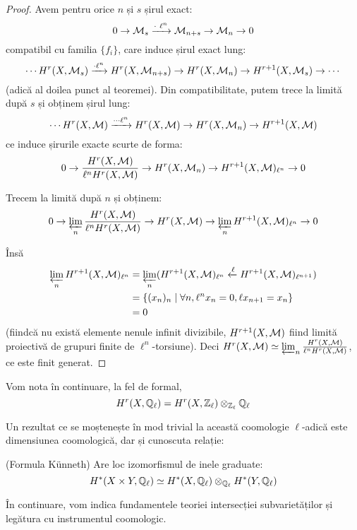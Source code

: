 \documentclass[13pt,openany,oneside]{book}
\begin{document}
\begin{proof}
Avem pentru orice $n$ și $s$ șirul exact:
$$0 \rightarrow \mathcal{M}_s \xrightarrow{\cdot\ \ell^n} \mathcal{M}_{n+s} \rightarrow \mathcal{M}_n \rightarrow 0$$
compatibil cu familia $\{f_i\}$, care induce șirul exact lung:
$$\cdots H^r(X,\mathcal{M}_s) \xrightarrow{\cdot \ell^n} H^r(X,\mathcal{M}_{n+s}) \rightarrow H^r(X,\mathcal{M}_n) \rightarrow H^{r+1}(X,\mathcal{M}_s) \rightarrow \cdots$$
(adică al doilea punct al teoremei).
Din compatibilitate, putem trece la limită după $s$ și obținem șirul lung:
$$\cdots H^r(X,\mathcal{M}) \xrightarrow{\cdots \ell^n} H^r(X,\mathcal{M}) \rightarrow H^r(X,\mathcal{M}_n) \rightarrow H^{r+1}(X,\mathcal{M})$$
ce induce șirurile exacte scurte de forma:
$$0 \rightarrow \frac{H^r(X,\mathcal{M})}{\ell^n H^r(X,\mathcal{M})} \rightarrow H^r(X,\mathcal{M}_n) \rightarrow H^{r+1}(X,\mathcal{M})_{\ell^n} \rightarrow 0$$

Trecem la limită după $n$ și obținem:
$$0 \rightarrow \varprojlim_n \frac{H^r(X,\mathcal{M})}{\ell^n H^r(X,\mathcal{M})} \rightarrow H^r(X,\mathcal{M}) \rightarrow \varprojlim_n H^{r+1}(X,\mathcal{M})_{\ell^n} \rightarrow 0$$

Însă
\begin{align*}
\varprojlim_n H^{r+1}(X,\mathcal{M})_{\ell^n} &= \varprojlim_n (H^{r+1}(X,\mathcal{M})_{\ell^n} \xleftarrow{\ell} H^{r+1}(X,\mathcal{M})_{\ell^{n+1}})\\
&=\{(x_n)_n \mid \forall n, \ell^n x_n=0, \ell x_{n+1}=x_n\}\\
&=0
\end{align*}
(fiindcă nu există elemente nenule infinit divizibile, $H^{r+1}(X,\mathcal{M})$ fiind limită proiectivă de grupuri finite de $\ell^n$-torsiune). Deci $H^r(X,\mathcal{M})\simeq \varprojlim_n \frac{H^r(X,\mathcal{M})}{\ell^n H^r(X,\mathcal{M})}$, ce este finit generat.
\end{proof}

Vom nota în continuare, la fel de formal,
$$H^r(X,\mathbb{Q}_\ell) = H^r(X,\mathbb{Z}_\ell) \otimes_{\mathbb{Z}_\ell} \mathbb{Q}_\ell$$

Un rezultat ce se moștenește în mod trivial la această coomologie $\ell$-adică este dimensiunea coomologică, dar și cunoscuta relație:

\begin{teo}
(Formula Künneth) Are loc izomorfismul de inele graduate:
$$H^*(X\times Y,\mathbb{Q}_\ell) \simeq H^*(X,\mathbb{Q}_\ell) \otimes_{\mathbb{Q}_\ell} H^*(Y,\mathbb{Q}_\ell)$$
\end{teo}

În continuare, vom indica fundamentele teoriei intersecției subvarietăților și legătura cu instrumentul coomologic.
\end{document}

